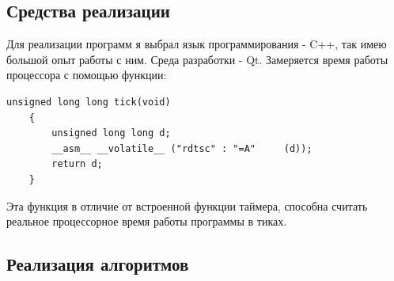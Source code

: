 \documentclass[a4paper, 14pt]{article}
\begin{document}
	\subsection{Средства реализации}
	Для реализации программ я выбрал язык программирования - C++, так имею большой опыт работы с ним. Среда разработки - Qt. Замеряется время работы процессора с помощью функции:\\
	\begin{lstlisting}[label=time,caption=Функция замера процессороного времени]
    unsigned long long tick(void)
    {
        unsigned long long d;
        __asm__ __volatile__ ("rdtsc" : "=A"     (d));
        return d;
    }
	\end{lstlisting}
	Эта функция в отличие от встроенной функции таймера, способна считать реальное процессорное время работы программы в тиках\cite{lom}.

	\newpage
	\subsection{Реализация алгоритмов}
	
\end{document}
